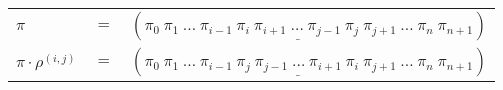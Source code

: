 \begin{example}\label{example:COJXWMAC}
  \hfill \break
  \begin{tabular}{lll}
    $\pi$ & $=$ & $(\pi_0~\pi_1~\dots~\pi_{i-1}~\underline{\pi_{i}~\pi_{i+1}~\dots~\pi_{j-1}~\pi_{j}}~\pi_{j+1}~\dots~\pi_{n}~\pi_{n+1})$ \\
    $\pi \cdot \rho^{(i,j)}$ & $=$ & $(\pi_0~\pi_1~\dots~\pi_{i-1}~\underline{\pi_{j}~\pi_{j-1}~\dots~\pi_{i+1}~\pi_{i}}~\pi_{j+1}~\dots~\pi_{n}~\pi_{n+1})$ \\
  \end{tabular}
\end{example}